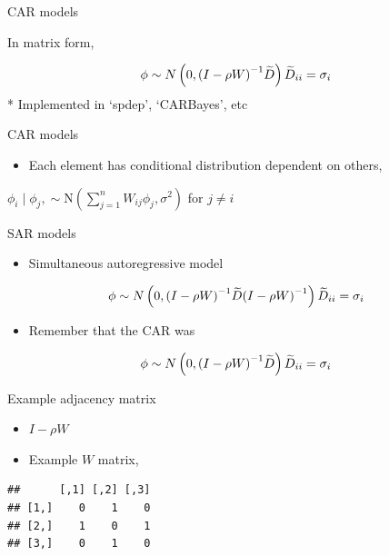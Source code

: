 \documentclass[
  ignorenonframetext,
]{beamer}
\providecommand{\tightlist}{%
  \setlength{\itemsep}{0pt}\setlength{\parskip}{0pt}}
\begin{document}
\begin{frame}{CAR models}
\protect\hypertarget{car-models}{}

In matrix form,

\[{ \phi\sim N\left( 0,{ \left( I-\rho W \right)  }^{ -1 }\widetilde { D }  \right) \\ { \widetilde { D }  }_{ ii }={ \sigma  }_{ i } }\]
* Implemented in `spdep', `CARBayes', etc

\end{frame}

\begin{frame}{CAR models}
\protect\hypertarget{car-models-1}{}

\begin{itemize}
\tightlist
\item
  Each element has conditional distribution dependent on others,
\end{itemize}

\(\phi_i \mid \phi_j, \sim \mathrm{N} \left( \sum_{j = 1}^n W_{ij} \phi_j, {\sigma}^2 \right)\)
for \(j \neq i\)

\end{frame}

\begin{frame}{SAR models}
\protect\hypertarget{sar-models}{}

\begin{itemize}
\tightlist
\item
  Simultaneous autoregressive model
\end{itemize}

\[{ \phi \sim N\left( 0,{ \left( I-\rho W \right)  }^{ -1 }\widetilde { D } { \left( I-\rho W \right)  }^{ -1 } \right) \\ { \widetilde { D }  }_{ ii }={ \sigma  }_{ i } }\]

\begin{itemize}
\tightlist
\item
  Remember that the CAR was
\end{itemize}

\[{ \phi \sim N\left( 0,{ \left( I-\rho W \right)  }^{ -1 }\widetilde { D }  \right) \\ { \widetilde { D }  }_{ ii }={ \sigma  }_{ i } }\]

\end{frame}

\begin{frame}[fragile]{Example adjacency matrix}
\protect\hypertarget{example-adjacency-matrix}{}

\begin{itemize}
\item
  \(I-\rho W\)
\item
  Example \(W\) matrix,
\end{itemize}

\begin{verbatim}
##      [,1] [,2] [,3]
## [1,]    0    1    0
## [2,]    1    0    1
## [3,]    0    1    0
\end{verbatim}

\end{frame}
\end{document}
